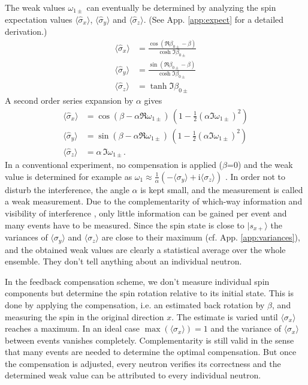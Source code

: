 \documentclass[english,keywords,aps,twocolumn]{revtex4-1}
\newcommand{\im}{\text{i}}
\begin{document}
The weak values $\omega_{1\pm}$ can eventually be determined by analyzing the spin expectation values $\langle \hat \sigma_x \rangle$, $\langle \hat \sigma_y \rangle$ and $\langle \hat \sigma_z\rangle$. (See App. \ref{app:expect} for a detailed derivation.)
\begin{subequations}
\begin{alignat}{1}
  \langle \hat \sigma_x \rangle &= 
  \frac {\cos (\Re\beta_{0\pm}-\beta)}{\cosh \Im \beta_{0\pm}}  \label{eq:sigmax}\\
  \langle \hat \sigma_y \rangle &= 
  \frac {\sin (\Re\beta_{0\pm}-\beta)}{\cosh \Im \beta_{0\pm}}  \\
  \langle \hat \sigma_z \rangle &=
  \tanh \Im \beta_{0\pm}
\end{alignat}
\end{subequations}
A second order series expansion by $\alpha$ gives 
\begin{subequations}
\begin{alignat}{1}
 \langle \hat \sigma_x \rangle &= 
  \cos (\beta - \alpha\Re\omega_{1\pm}) \, \left( 1 - \frac 1 2 (\alpha \Im \omega_{1\pm})^2 \right) \label{eq:sxexpectweak}\\
 \langle \hat \sigma_y \rangle &= 
  \sin (\beta - \alpha\Re\omega_{1\pm}) \, \left( 1 - \frac 1 2 (\alpha \Im \omega_{1\pm})^2 \right) \\
\langle \hat \sigma_z \rangle 
  &= \alpha\, \Im \omega_{1\pm}. %
\end{alignat}
\end{subequations}
In a conventional experiment, no compensation is applied ($\beta$=0) and the weak value is determined for example as $\omega_1 \approx \frac 1 \alpha (-\langle\sigma_y\rangle + \im \langle\sigma_z\rangle)$ \cite{Sponar15,Vallone16,Denkmayr17}. 
In order not to disturb the interference, the angle $\alpha$ is kept small, and the measurement is called a weak measurement. Due to the complementarity of which-way information and visibility of interference \cite{Englert96}, only little information can be gained per event and many events have to be measured. Since the spin state is close to $|s_{x+}\rangle$ the variances of $\langle\sigma_y\rangle$ and $\langle\sigma_z\rangle$ are close to their maximum (cf. App. \ref{app:variances}), and the obtained weak values are clearly a statistical average over the whole ensemble. They don't tell anything about an individual neutron. 

In the feedback compensation scheme, we don't measure individual spin components but determine the spin rotation relative to its initial state. This is done by applying the compensation, i.e. an estimated back rotation by $\beta$, and measuring the spin in the original direction $x$. The estimate is varied until $\langle\sigma_x\rangle$ reaches a maximum. In an ideal case $\max(\langle\sigma_x\rangle)=1$ and the variance of $\langle\sigma_x\rangle$ between events vanishes completely. Complementarity is still valid in the sense that many events are needed to determine the optimal compensation. But once the compensation is adjusted, every neutron verifies its correctness and the determined  weak value can be attributed to every individual neutron.
\end{document}
